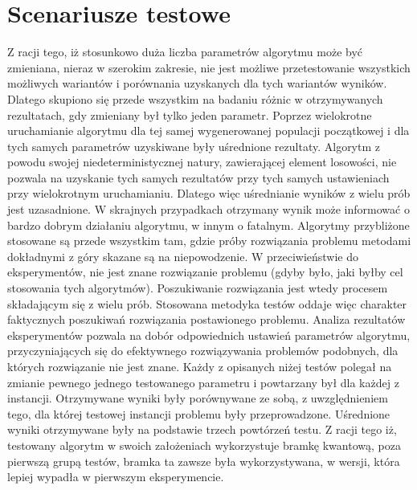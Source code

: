 \section{Scenariusze testowe}
\label{sec:scenariusze}
Z racji tego, iż stosunkowo duża liczba parametrów algorytmu może być zmieniana, nieraz w szerokim zakresie, nie jest możliwe przetestowanie wszystkich możliwych wariantów i porównania uzyskanych dla tych wariantów wyników. Dlatego skupiono się przede wszystkim na badaniu różnic w otrzymywanych rezultatach, gdy zmieniany był tylko jeden parametr. Poprzez wielokrotne uruchamianie algorytmu dla tej samej wygenerowanej populacji początkowej i dla tych samych parametrów uzyskiwane były uśrednione rezultaty. Algorytm z powodu swojej niedeterministycznej natury, zawierającej element losowości, nie pozwala na uzyskanie tych samych rezultatów przy tych samych ustawieniach przy wielokrotnym uruchamianiu. Dlatego więc uśrednianie wyników z wielu prób jest uzasadnione. W skrajnych przypadkach otrzymany wynik może informować o bardzo dobrym działaniu algorytmu, w innym o fatalnym. Algorytmy przybliżone stosowane są przede wszystkim tam, gdzie próby rozwiązania problemu metodami dokładnymi z góry skazane są na niepowodzenie. W przeciwieństwie do eksperymentów, nie jest znane rozwiązanie problemu (gdyby było, jaki byłby cel stosowania tych algorytmów). Poszukiwanie rozwiązania jest wtedy procesem składającym się z wielu prób. Stosowana metodyka testów oddaje więc charakter faktycznych poszukiwań rozwiązania postawionego problemu. Analiza rezultatów eksperymentów pozwala na dobór odpowiednich ustawień parametrów algorytmu, przyczyniających się do efektywnego rozwiązywania problemów podobnych, dla których rozwiązanie nie jest znane. Każdy z opisanych niżej testów polegał na zmianie pewnego jednego testowanego parametru i powtarzany był dla każdej z instancji. Otrzymywane wyniki były porównywane ze sobą, z uwzględnieniem tego, dla której testowej instancji problemu były przeprowadzone. Uśrednione wyniki otrzymywane były na podstawie trzech powtórzeń testu. Z racji tego iż, testowany algorytm w swoich założeniach wykorzystuje bramkę kwantową, poza pierwszą grupą testów, bramka ta zawsze była wykorzystywana, w wersji, która lepiej wypadła w pierwszym eksperymencie.

